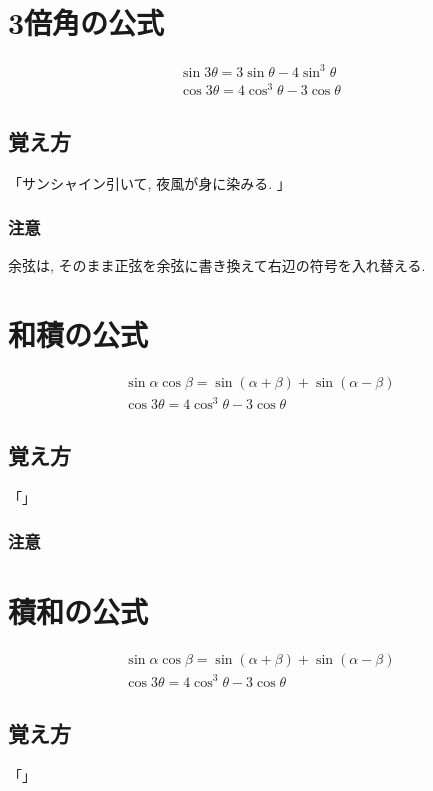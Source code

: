 \documentclass[]{jreport}
\begin{document}
\section{3倍角の公式}
\begin{equation}
    \begin{array}{l}
        \sin3\theta=3\sin\theta-4\sin^3\theta\\
        \cos3\theta=4\cos^3\theta-3\cos\theta
    \end{array}
\end{equation}
\subsection{覚え方}
「サンシャイン引いて, 夜風が身に染みる. 」
\subsubsection{注意}
余弦は, そのまま正弦を余弦に書き換えて右辺の符号を入れ替える.

\section{和積の公式}
\begin{equation}
    \begin{array}{l}
        \sin\alpha\cos\beta=\sin(\alpha+\beta)+\sin(\alpha-\beta)\\
        \cos3\theta=4\cos^3\theta-3\cos\theta
    \end{array}
\end{equation}
\subsection{覚え方}
「」
\subsubsection{注意}

\section{積和の公式}
\begin{equation}
    \begin{array}{l}
        \sin\alpha\cos\beta=\sin(\alpha+\beta)+\sin(\alpha-\beta)\\
        \cos3\theta=4\cos^3\theta-3\cos\theta
    \end{array}
\end{equation}
\subsection{覚え方}
「」
\end{document}
